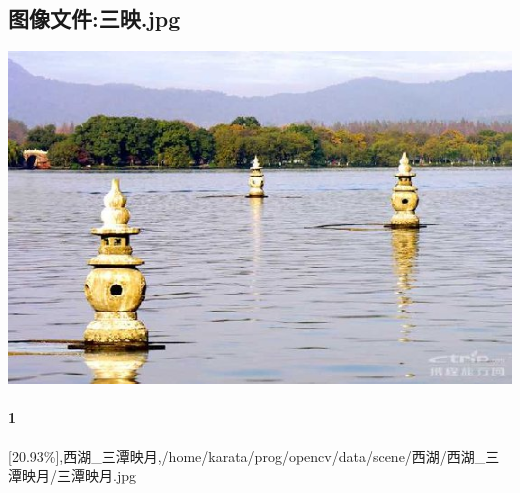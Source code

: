 \subsection{图像文件:三映.jpg}
\includegraphics[width=15cm,angle=0]{三映.jpg}

\paragraph{1}
[20.93\%],西湖_三潭映月,/home/karata/prog/opencv/data/scene/西湖/西湖_三潭映月/三潭映月.jpg

